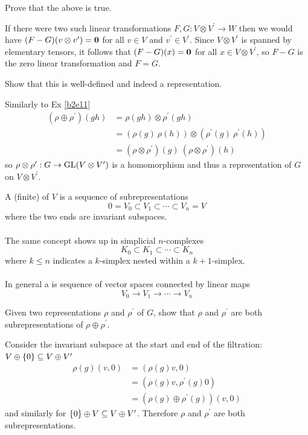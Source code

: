 \documentclass[10pt]{article}
\begin{document}
\begin{example}
	Prove that the above is true.
\end{example}
\sol If there were two such linear transformations $F,G:V\otimes V^\prime \to W$ then we would have $(F-G)(v \otimes v^\prime) = \textbf{0}$ for all $v \in V$ and $v^\prime \in V^\prime$. Since $V\otimes V^\prime$ is spanned by elementary tensors, it follows that $(F-G)(x) = \textbf{0}$ for all $x \in V\otimes V^\prime$, so $F-G$ is the zero linear transformation and $F=G$.


\begin{example}
	Show that this is well-defined and indeed a representation.
\end{example}
\sol Similarly to Ex \ref{b2e11}
$$
\begin{aligned}
	(\rho \oplus \rho^\prime)(gh) &= \rho(gh) \otimes \rho^\prime(gh)\\
	&= (\rho(g)\:\rho(h)) \otimes (\rho^\prime(g)\:\rho^\prime(h))\\
	&= (\rho \otimes \rho^\prime)(g)\:(\rho \otimes \rho^\prime)(h)
\end{aligned}
$$
so $\rho \otimes \rho^\prime: G \to \text{GL}(V \otimes V^\prime)$ is a homomorphism and thus a representation of $G$ on $V \otimes V^\prime$.


\begin{definition}
	A (finite)  of $V$ is a sequence of subrepresentations
	$$0=V_0 \subset V_1 \subset \cdots \subset V_n =V$$
	where the two ends are invariant subspaces.\\\\
	The same concept shows up in simplicial $n$-complexes 
	$$K_0 \subset K_1 \subset \cdots \subset K_n$$
	where $k \le n$ indicates a $k$-simplex nested within a $k+1$-simplex.\\\\
	In general a  is sequence of vector spaces connected by linear maps
	$$V_0 \to V_1 \to \cdots \to V_n$$
\end{definition}


\begin{example}
	Given two representations $\rho$ and $\rho^\prime$ of $G$, show that $\rho$ and $\rho^\prime$ are both subrepresentations of $\rho\oplus\rho^\prime$.
\end{example}
\sol Consider the invariant subspace at the start and end of the filtration: $V\oplus\lbrace0\rbrace \subseteq V\oplus V^\prime$
$$
\begin{aligned}
	\rho(g)(v,0) &= (\rho(g)v,0)\\
	&= (\rho(g)v,\rho^\prime(g)0)\\
	&= (\rho(g)\oplus\rho^\prime(g))(v,0)
\end{aligned}
$$
and similarly for $\lbrace0\rbrace\oplus V \subseteq V\oplus V^\prime$. Therefore $\rho$ and $\rho^\prime$ are both subrepresentations.
\end{document}
